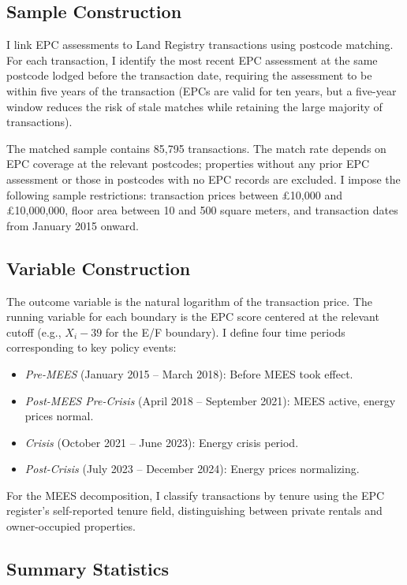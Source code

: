 \documentclass[12pt]{article}
\begin{document}
\subsection{Sample Construction}

I link EPC assessments to Land Registry transactions using postcode matching. For each transaction, I identify the most recent EPC assessment at the same postcode lodged before the transaction date, requiring the assessment to be within five years of the transaction (EPCs are valid for ten years, but a five-year window reduces the risk of stale matches while retaining the large majority of transactions).

The matched sample contains 85,795 transactions. The match rate depends on EPC coverage at the relevant postcodes; properties without any prior EPC assessment or those in postcodes with no EPC records are excluded. I impose the following sample restrictions: transaction prices between \pounds 10,000 and \pounds 10,000,000, floor area between 10 and 500 square meters, and transaction dates from January 2015 onward.

\subsection{Variable Construction}

The outcome variable is the natural logarithm of the transaction price. The running variable for each boundary is the EPC score centered at the relevant cutoff (e.g., $X_i - 39$ for the E/F boundary). I define four time periods corresponding to key policy events:

\begin{itemize}
\item \textit{Pre-MEES} (January 2015 -- March 2018): Before MEES took effect.
\item \textit{Post-MEES Pre-Crisis} (April 2018 -- September 2021): MEES active, energy prices normal.
\item \textit{Crisis} (October 2021 -- June 2023): Energy crisis period.
\item \textit{Post-Crisis} (July 2023 -- December 2024): Energy prices normalizing.
\end{itemize}

For the MEES decomposition, I classify transactions by tenure using the EPC register's self-reported tenure field, distinguishing between private rentals and owner-occupied properties.

\subsection{Summary Statistics}
\end{document}
